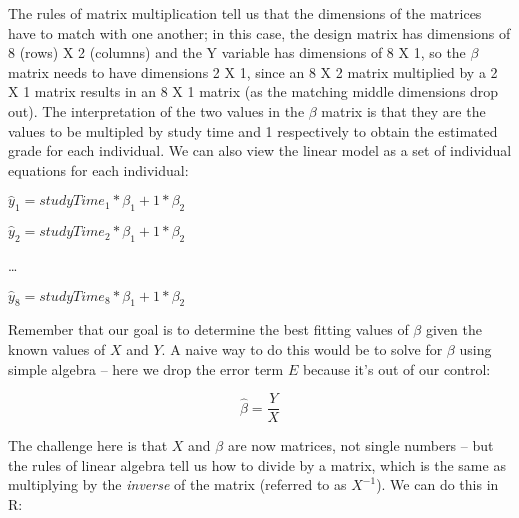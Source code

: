 \documentclass[]{book}
\newenvironment{Shaded}{\begin{snugshade}}{\end{snugshade}}
\newcommand{\KeywordTok}[1]{\textcolor[rgb]{0.13,0.29,0.53}{\textbf{#1}}}
\newcommand{\DataTypeTok}[1]{\textcolor[rgb]{0.13,0.29,0.53}{#1}}
\newcommand{\DecValTok}[1]{\textcolor[rgb]{0.00,0.00,0.81}{#1}}
\newcommand{\StringTok}[1]{\textcolor[rgb]{0.31,0.60,0.02}{#1}}
\newcommand{\CommentTok}[1]{\textcolor[rgb]{0.56,0.35,0.01}{\textit{#1}}}
\newcommand{\OperatorTok}[1]{\textcolor[rgb]{0.81,0.36,0.00}{\textbf{#1}}}
\newcommand{\NormalTok}[1]{#1}
\theoremstyle{definition}
\theoremstyle{definition}
\theoremstyle{definition}
\theoremstyle{remark}
\begin{document}
The rules of matrix multiplication tell us that the dimensions of the
matrices have to match with one another; in this case, the design matrix
has dimensions of 8 (rows) X 2 (columns) and the Y variable has
dimensions of 8 X 1, so the \(\beta\) matrix needs to have dimensions 2
X 1, since an 8 X 2 matrix multiplied by a 2 X 1 matrix results in an 8
X 1 matrix (as the matching middle dimensions drop out). The
interpretation of the two values in the \(\beta\) matrix is that they
are the values to be multipled by study time and 1 respectively to
obtain the estimated grade for each individual. We can also view the
linear model as a set of individual equations for each individual:

\(\hat{y}_1 = studyTime_1*\beta_1 + 1*\beta_2\)

\(\hat{y}_2 = studyTime_2*\beta_1 + 1*\beta_2\)

\ldots{}

\(\hat{y}_8 = studyTime_8*\beta_1 + 1*\beta_2\)

Remember that our goal is to determine the best fitting values of
\(\beta\) given the known values of \(X\) and \(Y\). A naive way to do
this would be to solve for \(\beta\) using simple algebra -- here we
drop the error term \(E\) because it's out of our control:

\[
\hat{\beta} = \frac{Y}{X}
\]

The challenge here is that \(X\) and \(\beta\) are now matrices, not
single numbers -- but the rules of linear algebra tell us how to divide
by a matrix, which is the same as multiplying by the \emph{inverse} of
the matrix (referred to as \(X^{-1}\)). We can do this in R:

\begin{Shaded}
\end{Shaded}
\end{document}
